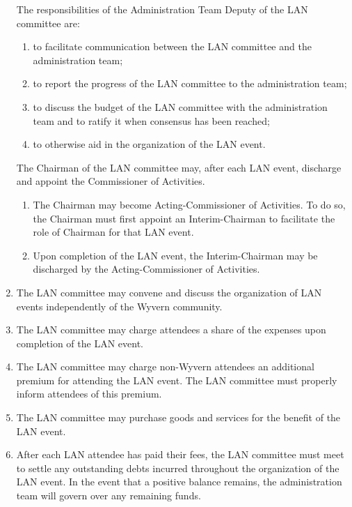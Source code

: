 \begin{enumerate}
    \begin{item}
        The responsibilities of the Administration Team Deputy of the LAN committee are:
        \begin{enumerate}
            \item to facilitate communication between the LAN committee and the administration team;
            \item to report the progress of the LAN committee to the administration team;
            \item to discuss the budget of the LAN committee with the administration team and to ratify it when consensus has been reached;
            \item to otherwise aid in the organization of the LAN event.
        \end{enumerate}
    \end{item}
    
    \begin{item}
        The Chairman of the LAN committee may, after each LAN event, discharge and appoint the Commissioner of Activities.
        \begin{enumerate}
            \item The Chairman may become Acting-Commissioner of Activities. To do so, the Chairman must first appoint an Interim-Chairman to facilitate the role of Chairman for that LAN event.
            \item Upon completion of the LAN event, the Interim-Chairman may be discharged by the Acting-Commissioner of Activities.
        \end{enumerate}
    \end{item}

    \item The LAN committee may convene and discuss the organization of LAN events independently of the Wyvern community.
    
    \item The LAN committee may charge attendees a share of the expenses upon completion of the LAN event.
    
    \item The LAN committee may charge non-Wyvern attendees an additional premium for attending the LAN event. The LAN committee must properly inform attendees of this premium.
    
    \item The LAN committee may purchase goods and services for the benefit of the LAN event.
    
    \item After each LAN attendee has paid their fees, the LAN committee must meet to settle any outstanding debts incurred throughout the organization of the LAN event. In the event that a positive balance remains, the administration team will govern over any remaining funds.
    

\end{enumerate}
